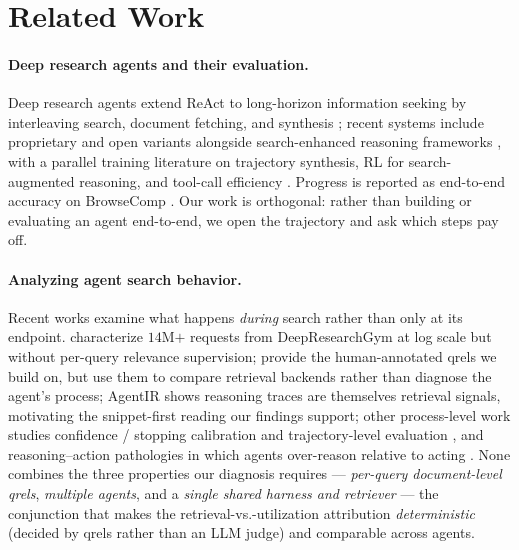 \section{Related Work}
\label{sec:related}

\paragraph{Deep research agents and their evaluation.} Deep research agents extend ReAct \citep{yao2023react} to long-horizon information seeking by interleaving search, document fetching, and synthesis \citep{Xi2025ASurveyof, Shi2025DeepResearchA}; recent systems include proprietary \citep{kimi2026k26} and open variants \citep{Team2025TongyiDeepResearchTechnical, Du2026OpenSeekerDemocratizingFrontier, Li2026OpenResearcherAFully, Li2025WebSailorNavigatingSuper-human} alongside search-enhanced reasoning frameworks \citep{Li2025SearchO1Agentic, Li2025WebThinkerEmpoweringLarge}, with a parallel training literature on trajectory synthesis, RL for search-augmented reasoning, and tool-call efficiency \citep{Jin2025Search-R1TrainingLLMs, Chen2025ReSearchLearningto, Wang2025OTCOptimalTool}. Progress is reported as end-to-end accuracy on BrowseComp \citep{Wei2025BrowseCompASimple}. Our work is orthogonal: rather than building or evaluating an agent end-to-end, we open the trajectory and ask which steps pay off.

\paragraph{Analyzing agent search behavior.} Recent works examine what happens \emph{during} search rather than only at its endpoint. \citet{Ning2026AgenticSearchin} characterize $14$M$+$ requests from DeepResearchGym \citep{Coelho2025DeepResearchGymAFree} at log scale but without per-query relevance supervision; \citet{Chen2025BrowseComp-PlusAMore} provide the human-annotated qrels we build on, but use them to compare retrieval backends rather than diagnose the agent's process; AgentIR \citep{Chen2026AgentIRReasoning-AwareRetrieval} shows reasoning traces are themselves retrieval signals, motivating the snippet-first reading our findings support; other process-level work studies confidence / stopping calibration and trajectory-level evaluation \citep{Ou2025BrowseConfConfidence-GuidedTest-Time, Sun2026DeepSearchwith, Chen2026TRACETrajectory-AwareComprehensive}, and reasoning--action pathologies in which agents over-reason relative to acting \citep{Cuadron2025DangerOverthinking}. None combines the three properties our diagnosis requires --- \emph{per-query document-level qrels}, \emph{multiple agents}, and a \emph{single shared harness and retriever} --- the conjunction that makes the retrieval-vs.-utilization attribution \emph{deterministic} (decided by qrels rather than an LLM judge) and comparable across agents.

